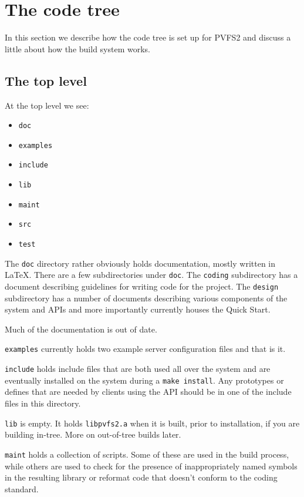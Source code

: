 \section{The code tree}

In this section we describe how the code tree is set up for PVFS2 and discuss
a little about how the build system works.

\subsection{The top level}

At the top level we see:
\begin{itemize}
\item \texttt{doc}
\item \texttt{examples}
\item \texttt{include}
\item \texttt{lib}
\item \texttt{maint}
\item \texttt{src}
\item \texttt{test}
\end{itemize}

The \texttt{doc} directory rather obviously holds documentation, mostly
written in LaTeX.  There are a few subdirectories under \texttt{doc}.  The
\texttt{coding} subdirectory has a document describing guidelines for writing
code for the project.  The \texttt{design} subdirectory has a number of
documents describing various components of the system and APIs and more
importantly currently houses the Quick Start.

Much of the documentation is out of date.

\texttt{examples} currently holds two example server configuration files
and that is it.

\texttt{include} holds include files that are both used all over
the system and are eventually installed on the system during a \texttt{make
install}.  Any prototypes or defines that are needed by clients using the API
should be in one of the include files in this directory.

\texttt{lib} is empty.  It holds \texttt{libpvfs2.a} when it is built, prior
to installation, if you are building in-tree.  More on out-of-tree builds
later.

\texttt{maint} holds a collection of scripts.  Some of these are used in the
build process, while others are used to check for the presence of
inappropriately named symbols in the resulting library or reformat code that
doesn't conform to the coding standard.

